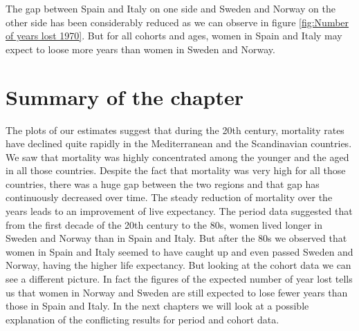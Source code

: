 The gap between Spain and Italy on one side and Sweden and Norway on the other side has been considerably reduced as we can observe in figure \ref{fig:Number of years lost 1970}. 
But for all cohorts and ages, women in Spain and Italy may expect to loose more years than women in Sweden and Norway.

            
 \section{Summary of the chapter } 
 
The plots of our estimates suggest that during the 20th century, mortality rates have declined quite rapidly in the Mediterranean and the Scandinavian countries.
We saw that mortality was highly concentrated among the younger and the aged in all those countries.
Despite the fact that mortality was very high for all those countries, there was a huge gap between the two regions and that gap has continuously decreased over time.
The steady reduction of mortality over the years leads to an improvement of live expectancy.
The period data suggested that from the first decade of the 20th century to the 80s, women lived longer in Sweden and Norway than in Spain and Italy. 
But after the 80s we observed that women in Spain and Italy seemed to have caught up and even passed Sweden and Norway, having the higher life expectancy.
But looking at the cohort data we can see a different picture.
In fact the figures of the expected number of year lost tells us that women in Norway and Sweden are still expected to lose fewer years than those in Spain and Italy. 
In the next chapters we will look at a possible explanation of the conflicting results for period and cohort data.







